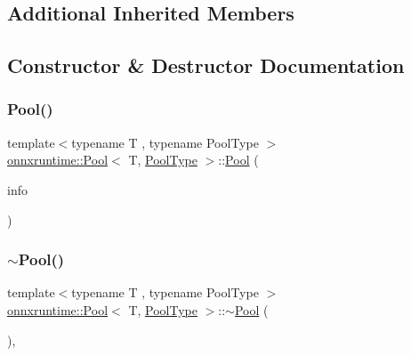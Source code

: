 \subsection*{Additional Inherited Members}


\subsection{Constructor \& Destructor Documentation}
\mbox{\label{classonnxruntime_1_1Pool_acac53fc4ac4307d7b3bcd162015efcb4}} 
\subsubsection{\texorpdfstring{Pool()}{Pool()}}
{\footnotesize\ttfamily template$<$typename T , typename Pool\+Type $>$ \\
\mbox{\hyperlink{classonnxruntime_1_1Pool}{onnxruntime\+::\+Pool}}$<$ T, \mbox{\hyperlink{namespaceonnxruntime_aa4ff52f19ea8c4d3e4ce3ffbabbc7060}{Pool\+Type}} $>$\+::\mbox{\hyperlink{classonnxruntime_1_1Pool}{Pool}} (\begin{DoxyParamCaption}\item[{const \mbox{\hyperlink{classonnxruntime_1_1OpKernelInfo}{Op\+Kernel\+Info}} \&}]{info }\end{DoxyParamCaption})\hspace{0.3cm}{\ttfamily [inline]}}

\mbox{\label{classonnxruntime_1_1Pool_a66cabaed967e0f1f6f5e716d3100ca44}} 
\subsubsection{\texorpdfstring{$\sim$\+Pool()}{~Pool()}}
{\footnotesize\ttfamily template$<$typename T , typename Pool\+Type $>$ \\
\mbox{\hyperlink{classonnxruntime_1_1Pool}{onnxruntime\+::\+Pool}}$<$ T, \mbox{\hyperlink{namespaceonnxruntime_aa4ff52f19ea8c4d3e4ce3ffbabbc7060}{Pool\+Type}} $>$\+::$\sim$\mbox{\hyperlink{classonnxruntime_1_1Pool}{Pool}} (\begin{DoxyParamCaption}{ }\end{DoxyParamCaption})\hspace{0.3cm}{\ttfamily [inline]}, {\ttfamily [override]}}




